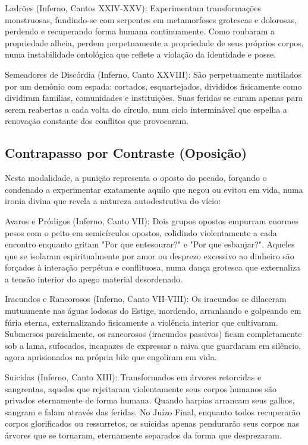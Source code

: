 Ladrões (Inferno, Cantos XXIV-XXV): Experimentam transformações monstruosas, fundindo-se com serpentes em metamorfoses grotescas e dolorosas, perdendo e recuperando forma humana continuamente. Como roubaram a propriedade alheia, perdem perpetuamente a propriedade de seus próprios corpos, numa instabilidade ontológica que reflete a violação da identidade e posse.

Semeadores de Discórdia (Inferno, Canto XXVIII): São perpetuamente mutilados por um demônio com espada: cortados, esquartejados, divididos fisicamente como dividiram famílias, comunidades e instituições. Suas feridas se curam apenas para serem reabertas a cada volta do círculo, num ciclo interminável que espelha a renovação constante dos conflitos que provocaram.

\subsection{Contrapasso por Contraste (Oposição)}

Nesta modalidade, a punição representa o oposto do pecado, forçando o condenado a experimentar exatamente aquilo que negou ou evitou em vida, numa ironia divina que revela a natureza autodestrutiva do vício:

Avaros e Pródigos (Inferno, Canto VII): Dois grupos opostos empurram enormes pesos com o peito em semicírculos opostos, colidindo violentamente a cada encontro enquanto gritam "Por que entesourar?" e "Por que esbanjar?". Aqueles que se isolaram espiritualmente por amor ou desprezo excessivo ao dinheiro são forçados à interação perpétua e conflituosa, numa dança grotesca que externaliza a tensão interior do apego material desordenado.

Iracundos e Rancorosos (Inferno, Canto VII-VIII): Os iracundos se dilaceram mutuamente nas águas lodosas do Estige, mordendo, arranhando e golpeando em fúria eterna, externalizando fisicamente a violência interior que cultivaram. Submersos parcialmente, os rancorosos (iracundos passivos) ficam completamente sob a lama, sufocados, incapazes de expressar a raiva que guardaram em silêncio, agora aprisionados na própria bile que engoliram em vida.

Suicidas (Inferno, Canto XIII): Transformados em árvores retorcidas e sangrentas, aqueles que rejeitaram violentamente seus corpos humanos são privados eternamente de forma humana. Quando harpias arrancam seus galhos, sangram e falam através das feridas. No Juízo Final, enquanto todos recuperarão corpos glorificados ou ressurretos, os suicidas apenas pendurarão seus corpos nas árvores que se tornaram, eternamente separados da forma que desprezaram.

